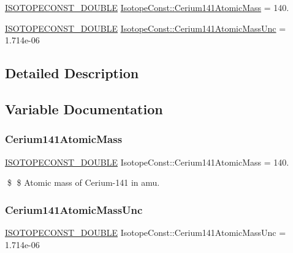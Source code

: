 \begin{DoxyCompactItemize}
\item 
\mbox{\hyperlink{group___isotope_const-_macros_ga8f45a7272ce02c0b4c65c44636ed719a}{I\+S\+O\+T\+O\+P\+E\+C\+O\+N\+S\+T\+\_\+\+D\+O\+U\+B\+LE}} \mbox{\hyperlink{group___isotope_const-_cerium-_ce141_gad91914a8056f422c07078ccfc027617d}{Isotope\+Const\+::\+Cerium141\+Atomic\+Mass}} = 140.
\item 
\mbox{\hyperlink{group___isotope_const-_macros_ga8f45a7272ce02c0b4c65c44636ed719a}{I\+S\+O\+T\+O\+P\+E\+C\+O\+N\+S\+T\+\_\+\+D\+O\+U\+B\+LE}} \mbox{\hyperlink{group___isotope_const-_cerium-_ce141_gae29b79c49bd6d789cfa43c14318a8937}{Isotope\+Const\+::\+Cerium141\+Atomic\+Mass\+Unc}} = 1.\+714e-\/06
\end{DoxyCompactItemize}


\subsection{Detailed Description}


\subsection{Variable Documentation}
\mbox{\label{group___isotope_const-_cerium-_ce141_gad91914a8056f422c07078ccfc027617d}} 
\subsubsection{\texorpdfstring{Cerium141\+Atomic\+Mass}{Cerium141AtomicMass}}
{\footnotesize\ttfamily \mbox{\hyperlink{group___isotope_const-_macros_ga8f45a7272ce02c0b4c65c44636ed719a}{I\+S\+O\+T\+O\+P\+E\+C\+O\+N\+S\+T\+\_\+\+D\+O\+U\+B\+LE}} Isotope\+Const\+::\+Cerium141\+Atomic\+Mass = 140.}

\$ \$ Atomic mass of Cerium-\/141 in amu. \mbox{\label{group___isotope_const-_cerium-_ce141_gae29b79c49bd6d789cfa43c14318a8937}} 
\subsubsection{\texorpdfstring{Cerium141\+Atomic\+Mass\+Unc}{Cerium141AtomicMassUnc}}
{\footnotesize\ttfamily \mbox{\hyperlink{group___isotope_const-_macros_ga8f45a7272ce02c0b4c65c44636ed719a}{I\+S\+O\+T\+O\+P\+E\+C\+O\+N\+S\+T\+\_\+\+D\+O\+U\+B\+LE}} Isotope\+Const\+::\+Cerium141\+Atomic\+Mass\+Unc = 1.\+714e-\/06}

